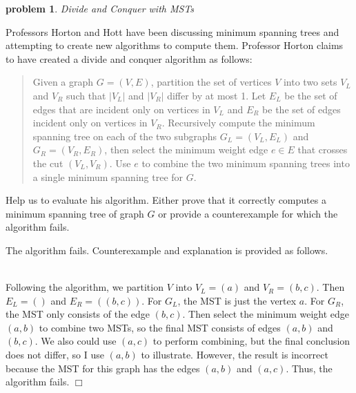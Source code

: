 \documentclass[10pt]{article}
\newenvironment{proof}{\par\noindent{\it Proof.}\hspace*{1em}}{$\Box$\bigskip}
\newcommand{\points}[1]{\normalfont{[#1 points]}}
\newtheorem{problem}{\sc\color{cit}problem}
\begin{document}
\begin{problem}Divide and Conquer with MSTs \points{13} \end{problem}

Professors Horton and Hott have been discussing minimum spanning trees and attempting to create new algorithms to compute them.  Professor Horton claims to have created a divide and conquer algorithm as follows:  
\begin{quote}
    Given a graph $G = (V,E)$, partition the set of vertices $V$ into two sets $V_L$ and $V_R$ such that $|V_L|$ and $|V_R|$ differ by at most 1.  Let $E_L$ be the set of edges that are incident only on vertices in $V_L$ and $E_R$ be the set of edges incident only on vertices in $V_R$.  Recursively compute the minimum spanning tree on each of the two subgraphs $G_L = (V_L, E_L)$ and $G_R = (V_R, E_R)$, then select the minimum weight edge $e \in E$ that crosses the cut $(V_L, V_R)$.  Use $e$ to combine the two minimum spanning trees into a single minimum spanning tree for $G$.
\end{quote}
Help us to evaluate his algorithm.  Either prove that it correctly computes a minimum spanning tree of graph $G$ or provide a counterexample for which the algorithm fails.
        \begin{proof}
        The algorithm fails. Counterexample and explanation is provided as follows.\\
\\
 Following the algorithm, we partition $V$ into $V_L=(a)$ and $V_R=(b,c)$. Then $E_L=()$ and $E_R=((b,c))$. For $G_L$, the MST is just the vertex $a$. For $G_R$, the MST only consists of the edge $(b,c)$. Then select the minimum weight edge $(a,b)$ to combine two MSTs, so the final MST consists of edges $(a,b)$ and $(b,c)$. We also could use $(a,c)$ to perform combining, but the final conclusion does not differ, so I use $(a,b)$ to illustrate. However, the result is incorrect because the MST for this graph has the edges $(a,b)$ and $(a,c)$. Thus, the algorithm fails.
\end{proof}
\end{document}
